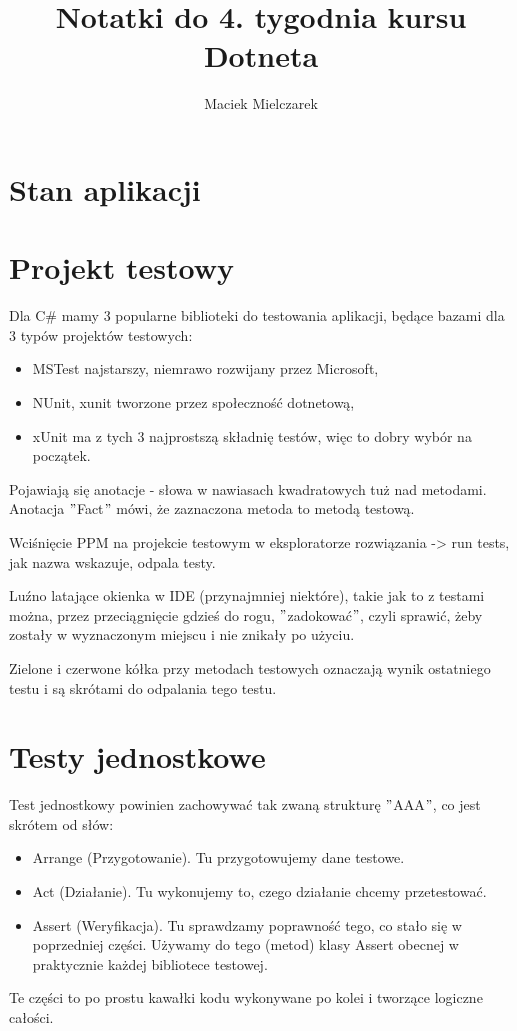 \documentclass[10pt]{article}
\title{Notatki do 4. tygodnia kursu Dotneta}
\author{Maciek Mielczarek}
\begin{document}
\maketitle

\tableofcontents

\section{Stan aplikacji}


\section{Projekt testowy}
Dla C\# mamy 3 popularne biblioteki do testowania aplikacji, będące bazami dla 3 typów projektów testowych:
\begin{itemize}
\item MSTest najstarszy, niemrawo rozwijany przez Microsoft,
\item NUnit, xunit tworzone przez społeczność dotnetową,
\item xUnit ma z tych 3 najprostszą składnię testów, więc to dobry wybór na początek.
\end{itemize}

Pojawiają się anotacje - słowa w nawiasach kwadratowych tuż nad metodami. Anotacja $"$Fact$"$ mówi, że zaznaczona metoda to metodą testową.

Wciśnięcie PPM na projekcie testowym w eksploratorze rozwiązania -> run tests, jak nazwa wskazuje, odpala testy.

Luźno latające okienka w IDE (przynajmniej niektóre), takie jak to z testami można, przez przeciągnięcie gdzieś do rogu, $"$zadokować$"$, czyli sprawić, żeby zostały w wyznaczonym miejscu i nie znikały po użyciu.

Zielone i czerwone kółka przy metodach testowych oznaczają wynik ostatniego testu i są skrótami do odpalania tego testu.

\section{Testy jednostkowe}
Test jednostkowy powinien zachowywać tak zwaną strukturę $"$AAA$"$, co jest skrótem od słów:
\begin{itemize}
\item Arrange (Przygotowanie). Tu przygotowujemy dane testowe.
\item Act (Działanie). Tu wykonujemy to, czego działanie chcemy przetestować.
\item Assert (Weryfikacja). Tu sprawdzamy poprawność tego, co stało się w poprzedniej części. Używamy do tego (metod) klasy Assert obecnej w praktycznie każdej bibliotece testowej.
\end{itemize}
Te części to po prostu kawałki kodu wykonywane po kolei i tworzące logiczne całości.
\end{document}
